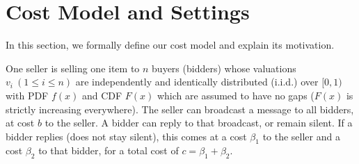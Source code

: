 \section{Cost Model and Settings}
\label{sec:model}

In this section, we formally define our cost model and explain its motivation. 


\begin{definition}[Setting]\label{def:model}
One seller is selling one item to $n$ buyers (bidders)
whose valuations $v_i~(1 \leq i \leq n)$ are independently and identically
distributed (i.i.d.) over $[0, 1)$ with PDF $f(x)$ and CDF $F(x)$
which are assumed to have no gaps ($F(x)$ is strictly increasing
everywhere).
The seller
can broadcast a message to all bidders, at cost $b$ to
the seller.  A bidder can reply to that broadcast, or remain silent.
If a bidder replies (does not stay silent), this comes at a cost $\beta_1$ to the
seller and a cost $\beta_2$ to that bidder, for a total cost of $c=\beta_1+\beta_2$.
\end{definition}

%

